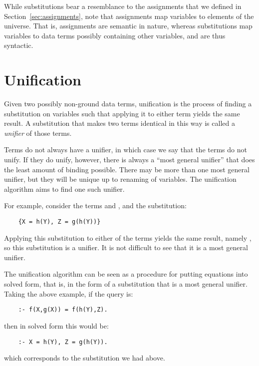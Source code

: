 While substitutions bear a resemblance to the assignments
that we defined in Section~\ref{sec:assignments},
note that assignments map variables to elements of the universe.
That is, assignments are semantic in nature,
whereas substitutions map variables to data terms
possibly containing other variables,
and are thus syntactic.


\section{Unification}
\label{sec:unification}

Given two possibly non-ground data terms,
unification is the process of finding a substitution on variables
such that applying it to either term yields the same result.
A substitution that makes two terms identical in this way
is called a \emph{unifier} of those terms.

Terms do not always have a unifier,
in which case we say that the terms do not unify.
If they do unify, however,
there is always a ``most general unifier''
that does the least amount of binding possible.
There may be more than one most general unifier,
but they will be unique up to renaming of variables.
The unification algorithm aims to find one such unifier.

For example,
consider the terms  and ,
and the substitution:
\begin{verbatim}
    {X = h(Y), Z = g(h(Y))}
\end{verbatim}
Applying this substitution to either of the terms
yields the same result,
namely ,
so this substitution is a unifier.
It is not difficult to see that it is a most general unifier.

The unification algorithm can be seen as
a procedure for putting equations into solved form\label{gi:solved-form2},
that is, in the form of a substitution
that is a most general unifier.
Taking the above example, if the query is:
\begin{verbatim}
    :- f(X,g(X)) = f(h(Y),Z).
\end{verbatim}
then in solved form this would be:
\begin{verbatim}
    :- X = h(Y), Z = g(h(Y)).
\end{verbatim}
which corresponds to the substitution we had above.

